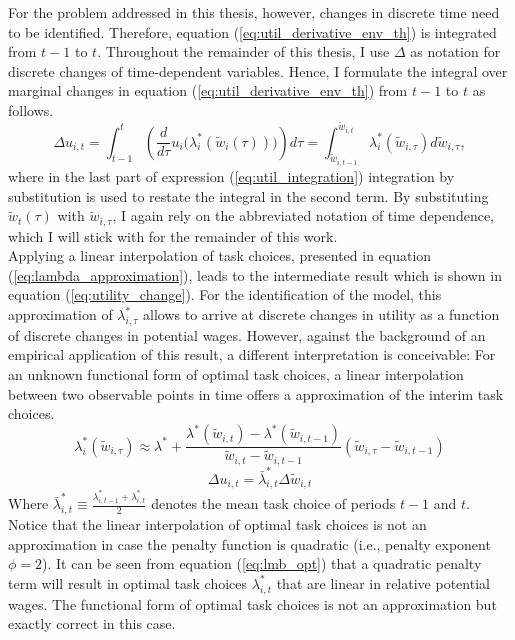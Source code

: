 \documentclass[../main.tex]{subfiles}
\begin{document}
For the problem addressed in this thesis, however, changes in discrete time need to be identified. Therefore, equation (\ref{eq:util_derivative_env_th}) is integrated from $t-1$ to $t$. Throughout the remainder of this thesis, I use $\Delta$ as notation for discrete changes of time-dependent variables. Hence, I formulate the integral over marginal changes in equation (\ref{eq:util_derivative_env_th}) from $t-1$ to $t$ as follows. 
\begin{equation} \label{eq:util_integration}
	\Delta u_{i,t} = \int^t_{t-1} \left( \frac{d}{d \tau} u_i\big(\lambda_i^*(\tilde{w}_i(\tau))\big) \right) d\tau = \int^{\tilde{w}_{i,t}}_{\tilde{w}_{i,t-1}} \lambda_i^*(\tilde{w}_{i, \tau}) d\tilde{w}_{i, \tau}, 
\end{equation}
where in the last part of expression (\ref{eq:util_integration}) integration by substitution is used to restate the integral in the second term. By substituting $\tilde{w}_t(\tau)$ with $\tilde{w}_{i,\tau}$, I again rely on the abbreviated notation of time dependence, which I will stick with for the remainder of this work. 
\\
Applying a linear interpolation of task choices, presented in equation (\ref{eq:lambda_approximation}), leads to the intermediate result which is shown in equation (\ref{eq:utility_change}). For the identification of the model, this approximation of $\lambda_{i,\tau}^*$ allows to arrive at discrete changes in utility as a function of discrete changes in potential wages. However, against the background of an empirical application of this result, a different interpretation is conceivable: For an unknown functional form of optimal task choices, a linear interpolation between two observable points in time offers a approximation of the interim task choices.
\begin{equation} \label{eq:lambda_approximation}
	\lambda^*_i(\tilde{w}_{i,\tau}) \approx \lambda^* + \frac{\lambda^*(\tilde{w}_{i,t}) - \lambda^*(\tilde{w}_{i,t-1})}{\tilde{w}_{i,t} - \tilde{w}_{i,t-1}} (\tilde{w}_{i,\tau} - \tilde{w}_{i,t-1})
\end{equation}
\begin{equation} \label{eq:utility_change}
	\Delta u_{i,t} = \bar{\lambda}_{i,t}^* \Delta \tilde{w}_{i,t}
\end{equation}
Where $\bar{\lambda}_{i,t}^* \equiv \frac{\lambda_{i,t-1}^* + \lambda_{i,t}^*}{2}$ denotes the mean task choice of periods $t-1$ and $t$. Notice that the linear interpolation of optimal task choices is not an approximation in case the penalty function is quadratic (i.e., penalty exponent $\phi = 2$). It can be seen from equation (\ref{eq:lmb_opt}) that a quadratic penalty term will result in optimal task choices $\lambda_{i,t}^*$ that are linear in relative potential wages. The functional form of optimal task choices is not an approximation but exactly correct in this case.
\end{document}
